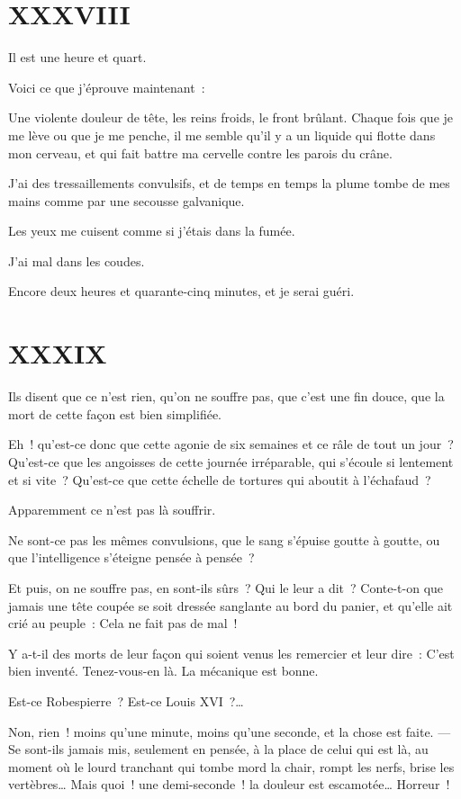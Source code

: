 \documentclass[french,twoside]{book} %
\begin{document}
 \section[{XXXVIII}]{XXXVIII}
\label{ch38}\renewcommand{\leftmark}{XXXVIII}

\noindent Il est une heure et quart.\par
Voici ce que j’éprouve maintenant :\par
Une violente douleur de tête, les reins froids, le front brûlant. Chaque fois que je me lève ou que je me penche, il me semble qu’il y a un liquide qui flotte dans mon cerveau, et qui fait battre ma cervelle contre les parois du crâne.\par
J’ai des tressaillements convulsifs, et de temps en temps la plume tombe de mes mains comme par une secousse galvanique.\par
Les yeux me cuisent comme si j’étais dans la fumée.\par
J’ai mal dans les coudes.\par
Encore deux heures et quarante-cinq minutes, et je serai guéri.
 \section[{XXXIX}]{XXXIX}
\label{ch39}\renewcommand{\leftmark}{XXXIX}

\noindent Ils disent que ce n’est rien, qu’on ne souffre pas, que c’est une fin douce, que la mort de cette façon est bien simplifiée.\par
Eh ! qu’est-ce donc que cette agonie de six semaines et ce râle de tout un jour ? Qu’est-ce que les angoisses de cette journée irréparable, qui s’écoule si lentement et si vite ? Qu’est-ce que cette échelle de tortures qui aboutit à l’échafaud ?\par
Apparemment ce n’est pas là souffrir.\par
Ne sont-ce pas les mêmes convulsions, que le sang s’épuise goutte à goutte, ou que l’intelligence s’éteigne pensée à pensée ?\par
Et puis, on ne souffre pas, en sont-ils sûrs ? Qui le leur a dit ? Conte-t-on que jamais une tête coupée se soit dressée sanglante au bord du panier, et qu’elle ait crié au peuple : Cela ne fait pas de mal !\par
Y a-t-il des morts de leur façon qui soient venus  les remercier et leur dire : C’est bien inventé. Tenez-vous-en là. La mécanique est bonne.\par
Est-ce Robespierre ? Est-ce Louis XVI ?…\par
Non, rien ! moins qu’une minute, moins qu’une seconde, et la chose est faite. — Se sont-ils jamais mis, seulement en pensée, à la place de celui qui est là, au moment où le lourd tranchant qui tombe mord la chair, rompt les nerfs, brise les vertèbres… Mais quoi ! une demi-seconde ! la douleur est escamotée… Horreur !
\end{document}
